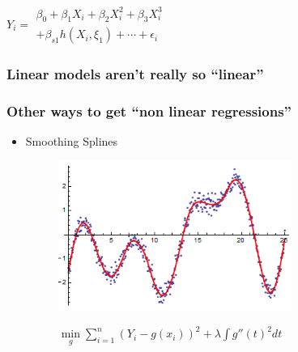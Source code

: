 \documentclass[xcolor={dvipsnames}]{beamer}
\begin{document}
{\begin{itemize}
\vspace{1em}

\hspace*{-.175in}$Y_i = \begin{array}{ll} 
\beta_0 + \beta_1X_i + \beta_2X_i^2  + \beta_3X_i^3   \\
+ \beta_{s1} h(X_i,\xi_1)  + \cdots + \epsilon_i 
\end{array} $
\vspace{-.63in}


\vspace{1in}


\end{itemize}
 
 

 
}

\frame
{
\frametitle{Linear models aren't really so ``linear''}

}


\frame
{
 \frametitle{Other ways to get ``non linear regressions''}
 
 
 
 \begin{itemize}
 
  \item Smoothing Splines  

\begin{figure}
\centering
\includegraphics[width=3in]{stuff/spline.png} 

$\displaystyle\underset{g}{\min} \sum_{i=1}^n (Y_i -g(x_i))^2 + \lambda \int g''(t)^2 dt$
\end{figure}

\end{itemize}
}
\end{document}
